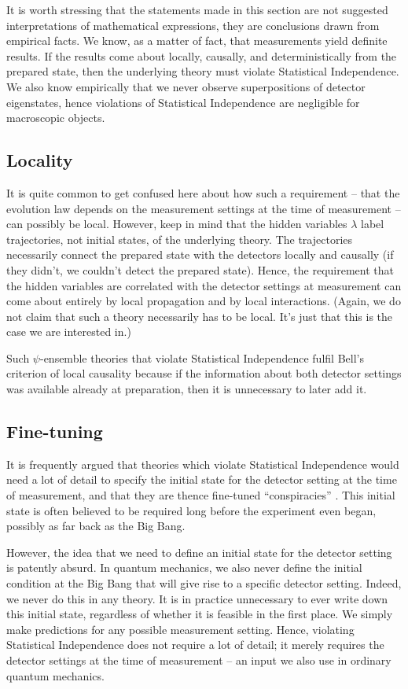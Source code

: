 \documentclass[superscriptaddress,floatfix,nofootinbib,12pt]{revtex4-2}
\begin{document}
It is worth stressing that the statements made in this section are not suggested interpretations of mathematical expressions, they are conclusions drawn from empirical facts. We know, as a matter of fact, that measurements yield definite results. If the results come about locally, causally, and deterministically from the prepared state, then the underlying theory must violate Statistical Independence. We also know empirically that we never observe superpositions of detector eigenstates, hence violations of Statistical Independence are negligible for macroscopic objects. 

\subsection{Locality}


It is quite common to get confused here about how such a requirement -- that the evolution law depends on the measurement settings at the time of measurement -- can possibly be local. However, keep in mind that the hidden variables $\lambda$ label trajectories, not initial states, of the underlying theory. The trajectories necessarily connect the prepared state with the detectors locally and causally (if they didn't, we couldn't detect the prepared state). Hence, the requirement that the hidden variables are correlated with the detector settings at measurement can come about entirely by local propagation and by local interactions. (Again, we do not claim that such a theory necessarily has to be local. It's just that this is the case we are interested in.)

Such $\psi$-ensemble theories that violate Statistical Independence fulfil Bell's criterion of local causality because if the information about both detector settings was available already at preparation, then it is unnecessary to later add it. 

\subsection{Fine-tuning}

It is frequently argued that theories which violate Statistical Independence would need a lot of detail to specify the initial state for the detector setting at the time of measurement, and that they are thence fine-tuned ``conspiracies'' \cite{Sen2020Superdet2}. This initial state is often believed to be required long before the experiment even began, possibly as far back as the Big Bang. 

However, the idea that we need to define an initial state for the detector setting is patently absurd. In quantum mechanics, we also never define the initial condition at the Big Bang that will give rise to a specific detector setting. Indeed, we never do this in any theory. It is in practice unnecessary to ever write down this initial state, regardless of whether it is feasible in the first place. We simply make predictions for any possible measurement setting. Hence, violating Statistical Independence does not require a lot of detail; it merely requires the detector settings at the time of measurement -- an input we also use in ordinary quantum mechanics.
\end{document}
